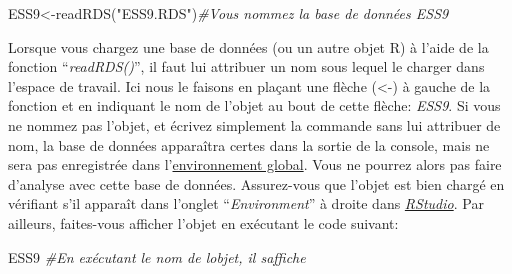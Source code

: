 \documentclass[
]{book}
\newenvironment{Shaded}{\begin{snugshade}}{\end{snugshade}}
\newcommand{\CommentTok}[1]{\textcolor[rgb]{0.56,0.35,0.01}{\textit{#1}}}
\newcommand{\FunctionTok}[1]{\textcolor[rgb]{0.00,0.00,0.00}{#1}}
\newcommand{\NormalTok}[1]{#1}
\newcommand{\OtherTok}[1]{\textcolor[rgb]{0.56,0.35,0.01}{#1}}
\newcommand{\StringTok}[1]{\textcolor[rgb]{0.31,0.60,0.02}{#1}}
\begin{document}
\begin{Shaded}
\begin{Highlighting}[]
\NormalTok{ESS9}\OtherTok{\textless{}{-}}\FunctionTok{readRDS}\NormalTok{(}\StringTok{"ESS9.RDS"}\NormalTok{)}\CommentTok{\#Vous nommez la base de données ESS9}
\end{Highlighting}
\end{Shaded}

Lorsque vous chargez une base de données (ou un autre objet R) à l'aide de la fonction ``\emph{readRDS()}'', il faut lui attribuer un nom sous lequel le charger dans l'espace de travail. Ici nous le faisons en plaçant une flèche (\textless-) à gauche de la fonction et en indiquant le nom de l'objet au bout de cette flèche: \emph{ESS9}. Si vous ne nommez pas l'objet, et écrivez simplement la commande sans lui attribuer de nom, la base de données apparaîtra certes dans la sortie de la console, mais ne sera pas enregistrée dans l'\protect\hyperlink{objets_envir}{environnement global}. Vous ne pourrez alors pas faire d'analyse avec cette base de données. Assurez-vous que l'objet est bien chargé en vérifiant s'il apparaît dans l'onglet ``\emph{Environment}'' à droite dans \href{https://posit.co/}{\emph{RStudio}}. Par ailleurs, faites-vous afficher l'objet en exécutant le code suivant:

\begin{Shaded}
\begin{Highlighting}[]
\NormalTok{ESS9 }\CommentTok{\#En exécutant le nom de l\textquotesingle{}objet, il s\textquotesingle{}affiche}
\end{Highlighting}
\end{Shaded}
\end{document}
